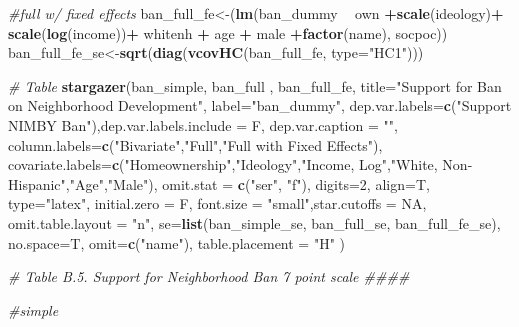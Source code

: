 \documentclass[]{article}
\newenvironment{Shaded}{\begin{snugshade}}{\end{snugshade}}
\newcommand{\CommentTok}[1]{\textcolor[rgb]{0.56,0.35,0.01}{\textit{#1}}}
\newcommand{\DataTypeTok}[1]{\textcolor[rgb]{0.13,0.29,0.53}{#1}}
\newcommand{\DecValTok}[1]{\textcolor[rgb]{0.00,0.00,0.81}{#1}}
\newcommand{\KeywordTok}[1]{\textcolor[rgb]{0.13,0.29,0.53}{\textbf{#1}}}
\newcommand{\NormalTok}[1]{#1}
\newcommand{\OperatorTok}[1]{\textcolor[rgb]{0.81,0.36,0.00}{\textbf{#1}}}
\newcommand{\OtherTok}[1]{\textcolor[rgb]{0.56,0.35,0.01}{#1}}
\newcommand{\StringTok}[1]{\textcolor[rgb]{0.31,0.60,0.02}{#1}}
\begin{document}
\begin{Shaded}
\begin{Highlighting}[]
{{{\CommentTok{#full w/ fixed effects}
\NormalTok{ban_full_fe<-(}\KeywordTok{lm}\NormalTok{(ban_dummy }\OperatorTok{~}\StringTok{  }\NormalTok{own }\OperatorTok{+}\KeywordTok{scale}\NormalTok{(ideology)}\OperatorTok{+}\StringTok{ }\KeywordTok{scale}\NormalTok{(}\KeywordTok{log}\NormalTok{(income))}\OperatorTok{+}\StringTok{ }\NormalTok{whitenh  }\OperatorTok{+}\StringTok{ }\NormalTok{age }\OperatorTok{+}\StringTok{ }\NormalTok{male }\OperatorTok{+}\KeywordTok{factor}\NormalTok{(name), socpoc))}
\NormalTok{ban_full_fe_se<-}\KeywordTok{sqrt}\NormalTok{(}\KeywordTok{diag}\NormalTok{(}\KeywordTok{vcovHC}\NormalTok{(ban_full_fe, }\DataTypeTok{type=}\StringTok{"HC1"}\NormalTok{)))}

\CommentTok{# Table}
\KeywordTok{stargazer}\NormalTok{(ban_simple,  ban_full , ban_full_fe, }\DataTypeTok{title=}\StringTok{"Support for Ban on Neighborhood Development"}\NormalTok{, }\DataTypeTok{label=}\StringTok{"ban_dummy"}\NormalTok{,}
          \DataTypeTok{dep.var.labels=}\KeywordTok{c}\NormalTok{(}\StringTok{"Support NIMBY Ban"}\NormalTok{),}\DataTypeTok{dep.var.labels.include =}\NormalTok{ F, }\DataTypeTok{dep.var.caption =} \StringTok{""}\NormalTok{,}
          \DataTypeTok{column.labels=}\KeywordTok{c}\NormalTok{(}\StringTok{"Bivariate"}\NormalTok{,}\StringTok{"Full"}\NormalTok{,}\StringTok{"Full with Fixed Effects"}\NormalTok{),}
          \DataTypeTok{covariate.labels=}\KeywordTok{c}\NormalTok{(}\StringTok{"Homeownership"}\NormalTok{,}\StringTok{"Ideology"}\NormalTok{,}\StringTok{"Income, Log"}\NormalTok{,}\StringTok{"White, Non-Hispanic"}\NormalTok{,}\StringTok{"Age"}\NormalTok{,}\StringTok{"Male"}\NormalTok{),}
          \DataTypeTok{omit.stat =} \KeywordTok{c}\NormalTok{(}\StringTok{"ser"}\NormalTok{, }\StringTok{"f"}\NormalTok{), }\DataTypeTok{digits=}\DecValTok{2}\NormalTok{, }\DataTypeTok{align=}\NormalTok{T, }\DataTypeTok{type=}\StringTok{"latex"}\NormalTok{,}
          \DataTypeTok{initial.zero =}\NormalTok{ F,  }\DataTypeTok{font.size =} \StringTok{"small"}\NormalTok{,}\DataTypeTok{star.cutoffs =} \OtherTok{NA}\NormalTok{, }\DataTypeTok{omit.table.layout =} \StringTok{"n"}\NormalTok{,}
          \DataTypeTok{se=}\KeywordTok{list}\NormalTok{(ban_simple_se, ban_full_se, ban_full_fe_se), }\DataTypeTok{no.space=}\NormalTok{T, }\DataTypeTok{omit=}\KeywordTok{c}\NormalTok{(}\StringTok{"name"}\NormalTok{), }\DataTypeTok{table.placement =} \StringTok{"H"}\NormalTok{ )}


\CommentTok{# Table B.5. Support for Neighborhood Ban 7 point scale ####}

\CommentTok{#simple}

}}}
\end{Highlighting}
\end{Shaded}
\end{document}
